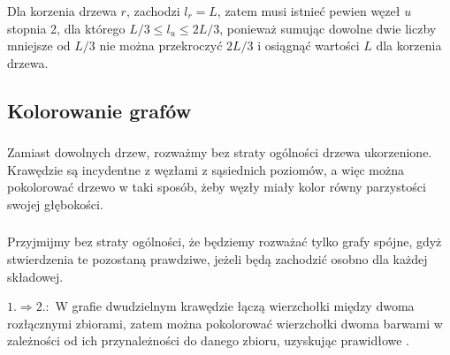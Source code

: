 Dla korzenia drzewa $r$, zachodzi $l_r=L$, zatem musi istnieć pewien węzeł $u$ stopnia 2, dla którego $L/3\le l_u\le 2L/3$, ponieważ sumując dowolne dwie liczby mniejsze od $L/3$ nie można przekroczyć $2L/3$ i osiągnąć wartości $L$ dla korzenia drzewa.

\problems

\subsection{Kolorowanie grafów} %
\subsubsection{} %
Zamiast dowolnych drzew, rozważmy bez straty ogólności drzewa ukorzenione. Krawędzie są incydentne z węzłami z sąsiednich poziomów, a więc można pokolorować drzewo w taki sposób, żeby węzły miały kolor równy parzystości swojej głębokości.

\subsubsection{} %
Przyjmijmy bez straty ogólności, że będziemy rozważać tylko grafy spójne, gdyż stwierdzenia te pozostaną prawdziwe, jeżeli będą zachodzić osobno dla każdej składowej.
\bigskip

$1.\Rightarrow 2.\!\!:$ W grafie dwudzielnym krawędzie łączą wierzchołki między dwoma rozłącznymi zbiorami, zatem można pokolorować wierzchołki dwoma barwami w zależności od ich przynależności do danego zbioru, uzyskując prawidłowe .
\bigskip

